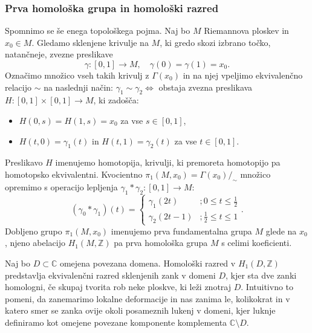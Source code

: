 \documentclass[8pt]{beamer}
\theoremstyle{definition}
\theoremstyle{remark}
\theoremstyle{plain}
\numberwithin{equation}{section}  %
\begin{document}
\begin{frame}
    \frametitle{Prva homološka grupa in homološki razred}

    Spomnimo se še enega topološkega pojma. Naj bo $M$ Riemannova ploskev in $x_0 \in M$. Gledamo sklenjene krivulje na $M$, ki gredo skozi izbrano točko, natančneje, zvezne preslikave 
    \begin{equation*}
        \gamma:[0,1] \rightarrow M, \quad \gamma(0)=\gamma(1)=x_0.
    \end{equation*}
    Označimo množico vseh takih krivulj z $\Gamma\left(x_0\right)$ in na njej vpeljimo ekvivalenčno relacijo $\sim$ na naslednji način: $\gamma_1 \sim \gamma_2 \Leftrightarrow$ obstaja zvezna preslikava $H:[0,1] \times[0,1] \rightarrow M$, ki zadošča:
    \begin{itemize}
      \item $H(0, s)=H(1, s)=x_0$ za vse $s \in[0,1]$,
      \item $H(t, 0)=\gamma_1(t)$ in $H(t, 1)=\gamma_2(t)$ za vse $t \in[0,1]$. 
    \end{itemize}
    Preslikavo $H$ imenujemo \textcolor{red1}{homotopija}, krivulji, ki premoreta homotopijo pa \textcolor{red1}{homotopsko ekvivalentni}. Kvocientno $\pi_1\left(M, x_0\right)=\Gamma\left(x_0\right) /_{\sim}$ množico opremimo s operacijo lepljenja $\gamma_1 * \gamma_2:[0,1] \rightarrow M$:
    \begin{equation*}
        \left(\gamma_0 * \gamma_1\right)(t)= \begin{cases}\gamma_1(2 t) &; 0 \leq t \leq \frac{1}{2} \\ \gamma_2(2 t-1) &; \frac{1}{2} \leq t \leq 1\end{cases}.
    \end{equation*}
    Dobljeno grupo $\pi_1\left(M, x_0\right)$ imenujemo \textcolor{red1}{prva fundamentalna grupa} $M$ glede na $x_0$, njeno abelacijo $H_1(M, \mathbb{Z})$ pa \textcolor{red1}{prva homološka grupa} $M$ \textcolor{red1}{s celimi koeficienti}.

    \vspace{0.8em}

    Naj bo $D\subset \mathbb{C}$ omejena povezana domena. \textcolor{red1}{Homološki razred} v $H_1(D, \mathbb{Z})$ predstavlja ekvivalenčni razred sklenjenih zank v domeni $D$, kjer sta dve zanki \textcolor{red1}{homologni}, če skupaj tvorita rob neke ploskve, ki leži znotraj $D$. Intuitivno to pomeni, da zanemarimo lokalne deformacije in nas zanima le, kolikokrat in v katero smer se zanka ovije okoli posameznih \textcolor{red1}{lukenj} v domeni, kjer luknje definiramo kot omejene povezane komponente komplementa $\mathbb{C} \setminus D$. 

\end{frame}
\end{document}
